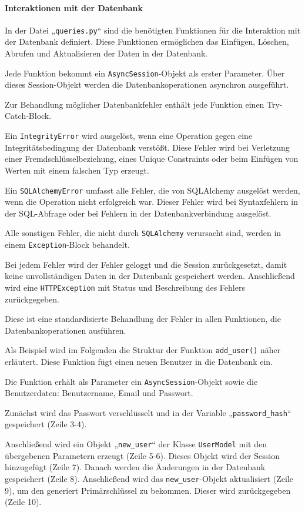 \documentclass[12pt, letterpaper]{article}
\begin{document}
  \paragraph{Interaktionen mit der Datenbank}
  \textbf{}
  \par In der Datei „\texttt{queries.py}“ sind die benötigten Funktionen für die Interaktion mit der Datenbank definiert. Diese Funktionen ermöglichen das Einfügen, Löschen, Abrufen und Aktualisieren der Daten in der Datenbank.
  \par Jede Funktion bekommt ein \texttt{AsyncSession}-Objekt als erster Parameter. Über dieses Session-Objekt werden die Datenbankoperationen asynchron ausgeführt.
  \par Zur Behandlung möglicher Datenbankfehler enthält jede Funktion einen Try-Catch-Block. 
  \par Ein \texttt{IntegrityError} wird ausgelöst, wenn eine Operation gegen eine Integritätsbedingung der Datenbank verstößt. Diese Fehler wird bei Verletzung einer Fremdschlüsselbeziehung, eines Unique Constraints oder beim Einfügen von Werten mit einem falschen Typ erzeugt. 
  \par Ein \texttt{SQLAlchemyError} umfasst alle Fehler, die von SQLAlchemy ausgelöst werden, wenn die Operation nicht erfolgreich war. Dieser Fehler wird bei Syntaxfehlern in der SQL-Abfrage oder bei Fehlern in der Datenbankverbindung ausgelöst.
  \par Alle sonstigen Fehler, die nicht durch \texttt{SQLAlchemy} verursacht sind, werden in einem \texttt{Exception}-Block behandelt.
  \par Bei jedem Fehler wird der Fehler geloggt und die Session zurückgesetzt, damit keine unvollständigen Daten in der Datenbank gespeichert werden. Anschließend wird eine \texttt{HTTPException} mit Status und Beschreibung des Fehlers zurückgegeben.
  \par Diese ist eine standardisierte Behandlung der Fehler in allen Funktionen, die Datenbankoperationen ausführen. 
  \par Als Beispiel wird im Folgenden die Struktur der Funktion \texttt{add\_user()} näher erläutert. Diese Funktion fügt einen neuen Benutzer in die Datenbank ein. 
  \par Die Funktion erhält als Parameter ein \texttt{AsyncSession}-Objekt sowie die Benutzerdaten: Benutzername, Email und Passwort. 
  \par Zunächst wird das Passwort verschlüsselt und in der Variable „\texttt{password\_hash}“ gespeichert (Zeile 3-4). 
  \par Anschließend wird ein Objekt „\texttt{new\_user}“ der Klasse \texttt{UserModel} mit den übergebenen Parametern erzeugt (Zeile 5-6). Dieses Objekt wird der Session hinzugefügt (Zeile 7). Danach werden die Änderungen in der Datenbank gespeichert (Zeile 8). Anschließend wird das \texttt{new\_user}-Objekt aktualisiert (Zeile 9), um den generiert Primärschlüssel zu bekommen. Dieser wird zurückgegeben (Zeile 10).
\end{document}
